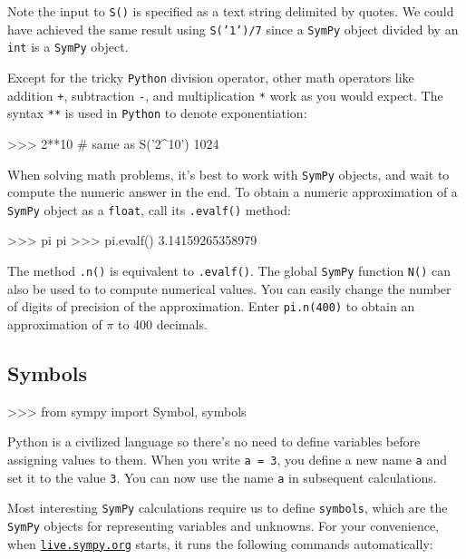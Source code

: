 \noindent
Note the input to \texttt{S()} is specified as a text string delimited by quotes.
We could have achieved the same result using \texttt{S('1')/7} since
a \texttt{SymPy} object divided by an \texttt{int} is a \texttt{SymPy} object.

Except for the tricky \texttt{Python} division operator, 
other math operators like addition \texttt{+}, subtraction \texttt{-}, 
and multiplication \texttt{*} work as you would expect.
The syntax \texttt{**} is used in \texttt{Python} to denote exponentiation:
\small
\begin{verbatimtab}
>>> 2**10                    # same as S('2^10')
1024
\end{verbatimtab}
\normalsize

\noindent
When solving math problems, 
it's best to work with \texttt{SymPy} objects,
and wait to compute the numeric answer in the end.
To obtain a numeric approximation of a \texttt{SymPy} object as a  \texttt{float}, 
call  its \texttt{.evalf()} method: %

\small
\begin{verbatimtab}
>>> pi
pi
>>> pi.evalf()
3.14159265358979
\end{verbatimtab}
\normalsize

\noindent
The method \texttt{.n()} is equivalent to \texttt{.evalf()}.
The global \texttt{SymPy} function \texttt{N()} can also be used to to compute numerical values.
%
You can easily change the number of digits of precision of the approximation.
Enter \texttt{pi.n(400)} to obtain an approximation of $\pi$ to 400 decimals.

\subsection{Symbols}
\label{basics:symbols}

\small
\begin{verbatimtab}
>>> from sympy import Symbol, symbols
\end{verbatimtab}
\normalsize

\noindent
Python is a civilized language so there's no need to define variables before assigning values to them.
When you write \texttt{a = 3}, you define a new name \texttt{a} and set it to the value \texttt{3}.
You can now use the name \texttt{a} in  subsequent calculations.

Most interesting \texttt{SymPy} calculations require us to define \texttt{symbols}, 
which are the \texttt{SymPy} objects for representing variables and unknowns.
For your convenience, when \href{http://live.sympy.org}{\texttt{live.sympy.org}} starts,
it runs the following commands automatically:

